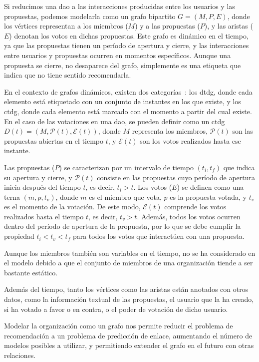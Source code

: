 Si reducimos una \gls{dao} a las interacciones producidas entre los usuarios y las propuestas, podemos modelarla como un grafo bipartito $G=(M, P, E)$, donde los vértices representan a los miembros ($M$) y a las propuestas ($P$), y las aristas ($E$) denotan los votos en dichas propuestas. Este grafo es dinámico en el tiempo, ya que las propuestas tienen un período de apertura y cierre, y las interacciones entre usuarios y propuestas ocurren en momentos específicos. Aunque una propuesta se cierre, no desaparece del grafo, simplemente es una etiqueta que indica que no tiene sentido recomendarla.

En el contexto de grafos dinámicos, existen dos categorías~\cite{rossi_temporal_2020}: los \gls{dtdg}, donde cada elemento está etiquetado con un conjunto de instantes en los que existe, y los \gls{ctdg}, donde cada elemento está marcado con el momento a partir del cual existe. En el caso de las votaciones en una \gls{dao}, se pueden definir como un \gls{ctdg} $D(t) = (M, \mathcal{P}(t), \mathcal{E}(t))$, donde $M$ representa los miembros, $\mathcal{P}(t)$ son las propuestas abiertas en el tiempo $t$, y $\mathcal{E}(t)$ son los votos realizados hasta ese instante.

Las propuestas ($P$) se caracterizan por un intervalo de tiempo $(t_i, t_f)$ que indica su apertura y cierre, y $\mathcal{P}(t)$ consiste en las propuestas cuyo período de apertura inicia después del tiempo $t$, es decir, $t_i>t$. Los votos ($E$) se definen como una terna $(m, p, t_v)$, donde $m$ es el miembro que vota, $p$ es la propuesta votada, y $t_v$ es el momento de la votación. De este modo, $\mathcal{E}(t)$ comprende los votos realizados hasta el tiempo $t$, es decir, $t_v > t$. Además, todos los votos ocurren dentro del período de apertura de la propuesta, por lo que se debe cumplir la propiedad $t_i < t_v < t_f$ para todos los votos que interactúen con una propuesta.

Aunque los miembros también son variables en el tiempo, no se ha considerado en el modelo debido a que el conjunto de miembros de una organización tiende a ser bastante estático.

Además del tiempo, tanto los vértices como las aristas están anotados con otros datos, como la información textual de las propuestas, el usuario que la ha creado, si ha votado a favor o en contra, o el poder de votación de dicho usuario.

Modelar la organización como un grafo nos permite reducir el problema de recomendación a un problema de predicción de enlace, aumentando el número de modelos posibles a utilizar, y permitiendo extender el grafo en el futuro con otras relaciones.

